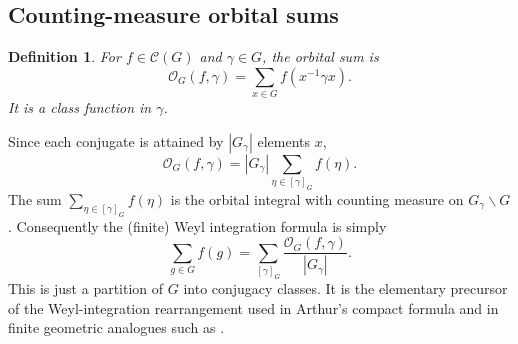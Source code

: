 \documentclass[12pt]{article}
\newtheorem{definition}[theorem]{Definition}
\theoremstyle{remark}
\newcommand{\cG}{\mathcal C(G)}
\newcommand{\Orb}{\mathcal O}
\begin{document}
\subsection{Counting-measure orbital sums}
\begin{definition}
For $f\in\cG$ and $\gamma\in G$, the \emph{orbital sum} is
\begin{equation}\label{eq:def-orbit}
 \Orb_G(f,\gamma)=\sum_{x\in G}f(x^{-1}\gamma x).
\end{equation}
It is a class function in $\gamma$.
\end{definition}
Since each conjugate is attained by $|G_\gamma|$ elements $x$,
\begin{equation}\label{eq:orbitquot}
 \Orb_G(f,\gamma)
  =|G_\gamma|\sum_{\eta\in[\gamma]_G}f(\eta).
\end{equation}
The sum $\sum_{\eta\in[\gamma]_G}f(\eta)$ is the orbital integral
with counting measure on $G_\gamma\backslash G$.
Consequently the (finite) Weyl integration formula is simply
\begin{equation}\label{eq:weyl}
 \sum_{g\in G}f(g)
 =\sum_{[\gamma]_G}\frac{\Orb_G(f,\gamma)}{|G_\gamma|}.
\end{equation}
This is just a partition of $G$ into conjugacy classes.
It is the elementary precursor of the Weyl-integration
rearrangement used in Arthur's compact formula
\cite[\S1]{ArthurHecke1989} and in finite geometric analogues
such as \cite[Ch.~22]{Terras1999}.
\end{document}
